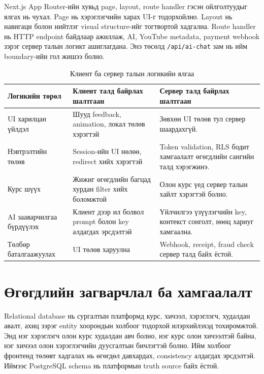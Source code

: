 Next.js App Router-ийн хувьд page, layout, route handler гэсэн ойлголтуудыг ялгах нь чухал. Page нь хэрэглэгчийн харах UI-г тодорхойлно. Layout нь навигаци болон нийтлэг visual structure-ийг тогтвортой хадгална. Route handler нь HTTP endpoint байдлаар ажиллаж, AI, YouTube metadata, payment webhook зэрэг сервер талын логикт ашиглагдана. Энэ төсөлд \texttt{/api/ai-chat} зам нь ийм boundary-ийн гол жишээ болно.

\begin{table}[htbp]
  \centering
  \begin{tabular}{|p{}|p{}|p{}|}
    \hline
    \textbf{Логикийн төрөл} & \textbf{Клиент талд байрлах шалтгаан} & \textbf{Сервер талд байрлах шалтгаан} \\ \hline
    UI харилцан үйлдэл & Шууд feedback, animation, локал төлөв хэрэгтэй & Зөвхөн UI төлөв тул сервер шаардахгүй. \\ \hline
    Нэвтрэлтийн төлөв & Session-ийн UI нөлөө, redirect хийх хэрэгтэй & Token validation, RLS бодит хамгаалалт өгөгдлийн сангийн талд хэрэгжинэ. \\ \hline
    Курс шүүх & Жижиг өгөгдлийн багцад хурдан filter хийх боломжтой & Олон курс үед сервер талын хайлт хэрэгтэй болно. \\ \hline
    AI зааварчилгаа бүрдүүлэх & Клиент дээр ил болвол prompt болон key алдагдах эрсдэлтэй & Үйлчилгээ үзүүлэгчийн key, контекст сонголт, нөөц хариуг хамгаална. \\ \hline
    Төлбөр баталгаажуулах & UI төлөв харуулна & Webhook, receipt, fraud check сервер талд байх ёстой. \\ \hline
  \end{tabular}
  \caption{Клиент ба сервер талын логикийн ялгаа}
  \label{tab:client-server-boundary}
\end{table}

\section{Өгөгдлийн загварчлал ба хамгаалалт}
Relational database нь сургалтын платформд курс, хичээл, хэрэглэгч, худалдан авалт, ахиц зэрэг entity хоорондын холбоог тодорхой илэрхийлэхэд тохиромжтой. Энд нэг хэрэглэгч олон курс худалдан авч болно, нэг курс олон хичээлтэй байна, нэг хичээл олон хэрэглэгчийн дуусгалтын бичлэгтэй болно. Ийм холбоог фронтенд төлөвт хадгалах нь өгөгдөл давхардах, consistency алдагдах эрсдэлтэй. Иймээс PostgreSQL schema нь платформын truth source байх ёстой.

